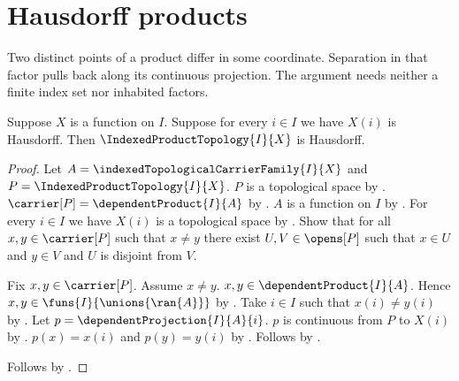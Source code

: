 \section{Hausdorff products}





Two distinct points of a product differ in some coordinate. Separation in
that factor pulls back along its continuous projection. The argument needs
neither a finite index set nor inhabited factors.

\begin{theorem}\label{indexed_product_of_hausdorff_spaces}
    Suppose $X$ is a function on $I$.
    Suppose for every $i\in I$ we have $X(i)$ is Hausdorff.
    Then $\IndexedProductTopology{I}{X}$ is Hausdorff.
\end{theorem}
\begin{proof}
    Let $A=\indexedTopologicalCarrierFamily{I}{X}$ and $P=\IndexedProductTopology{I}{X}$.
    $P$ is a topological space by .
    $\carrier[P]=\dependentProduct{I}{A}$ by .
    $A$ is a function on $I$ by .
    For every $i\in I$ we have $X(i)$ is a topological space by .
    Show that for all $x,y\in\carrier[P]$ such that $x\neq y$ there exist
        $U,V\in\opens[P]$ such that $x\in U$ and $y\in V$ and $U$ is disjoint from $V$.
    \begin{subproof}
        Fix $x,y\in\carrier[P]$.
        Assume $x\neq y$.
        $x,y\in\dependentProduct{I}{A}$.
        Hence $x,y\in\funs{I}{\unions{\ran{A}}}$ by .
        Take $i\in I$ such that $x(i)\neq y(i)$ by
            .
        Let $p=\dependentProjection{I}{A}{i}$.
        $p$ is continuous from $P$ to $X(i)$ by .
        $p(x)=x(i)$ and $p(y)=y(i)$ by .
        Follows by .
    \end{subproof}
    Follows by .
\end{proof}

